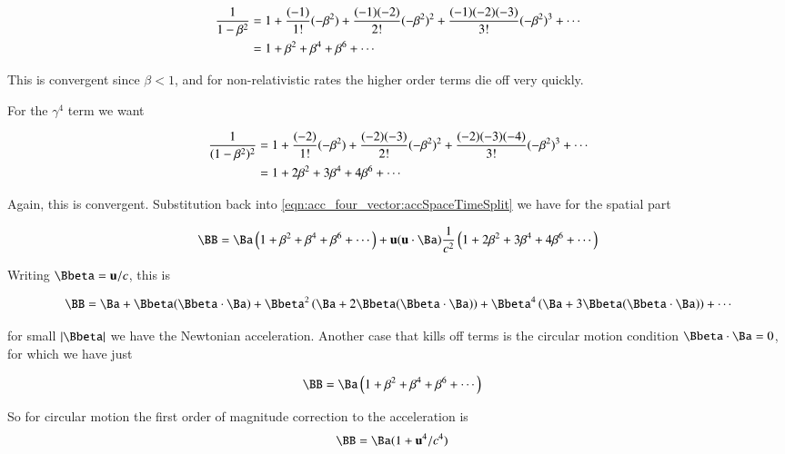 \begin{align*}
\frac{1}{1 - \beta^2} 
&=
1 
+ \frac{(-1)}{1!}(-\beta^2)
+ \frac{(-1)(-2)}{2!}(-\beta^2)^2
+ \frac{(-1)(-2)(-3)}{3!}(-\beta^2)^3
+ \cdots \\
&=
1 
+ \beta^2
+ \beta^4
+ \beta^6
+ \cdots \\
\end{align*}

This is convergent since $\beta < 1$, and for non-relativistic rates the higher order terms die off very quickly.

For the $\gamma^4$ term we want

\begin{align*}
\frac{1}{(1 - \beta^2)^2} 
&=
1 
+ \frac{(-2)}{1!}(-\beta^2)
+ \frac{(-2)(-3)}{2!}(-\beta^2)^2
+ \frac{(-2)(-3)(-4)}{3!}(-\beta^2)^3
+ \cdots \\
&=
1 
+ 2 \beta^2
+ 3 \beta^4
+ 4 \beta^6
+ \cdots \\
\end{align*}

Again, this is convergent.  Substitution back into \ref{eqn:acc_four_vector:accSpaceTimeSplit} we have for the spatial part

\begin{align*}
\BB &= \Ba 
\left(
1 
+ \beta^2
+ \beta^4
+ \beta^6
+ \cdots
\right)
+ \Bu (\Bu \cdot \Ba) \inv{c^2} 
\left(
1 
+ 2 \beta^2
+ 3 \beta^4
+ 4 \beta^6
+ \cdots 
\right)
\\
\end{align*}

Writing $\Bbeta = \Bu/c$, this is

\begin{align*}
\BB &= 
\Ba + \Bbeta (\Bbeta \cdot \Ba) 
+ \Bbeta^2 \left( \Ba + 2 \Bbeta (\Bbeta \cdot \Ba) \right)
+ \Bbeta^4 \left( \Ba + 3 \Bbeta (\Bbeta \cdot \Ba) \right)
+ \cdots
\\
\end{align*}

for small $\Abs{\Bbeta}$ we have the Newtonian acceleration.  Another case that kills off terms is the circular motion condition $\Bbeta \cdot \Ba = 0$, for which we have just

\begin{align*}
\BB &= \Ba 
\left(
1 
+ \beta^2
+ \beta^4
+ \beta^6
+ \cdots
\right)
\end{align*}

So for circular motion the first order of magnitude correction to the acceleration is 
\begin{align*}
\BB &= \Ba ( 1 + \Bu^4/c^4 )
\end{align*}

